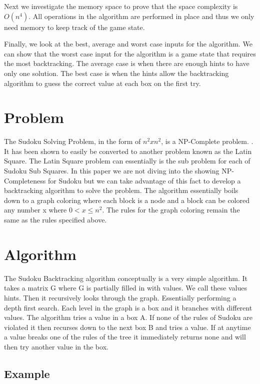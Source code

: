 \documentclass{sig-alternate}
\begin{document}
Next we investigate the memory space to prove that the space complexity is $O(n^4)$. All operations in the algorithm are performed in place and thus we only need memory to keep track of the game state. 

Finally, we look at the best, average and worst case inputs for the algorithm. We can show that the worst case input for the algorithm is a game state that requires the most backtracking. The average case is when there are enough hints to have only one solution. The best case is when the hints allow the backtracking algorithm to guess the correct value at each box on the first try. 

\section{Problem}
The Sudoku Solving Problem, in the form of $n^2 x n^2$, is a NP-Complete problem. \cite{YATO}. It has been shown to easily be converted to another problem known as the Latin Square. The Latin Square problem can essentially is the sub problem for each of Sudoku Sub Squares. In this paper we are not diving into the showing NP-Completeness for Sudoku but we can take advantage of this fact to develop a backtracking algorithm to solve the problem. The algorithm essentially boils down to a graph coloring where each block is a node and a block can be colored any number x where $0 < x \le n^2$. The rules for the graph coloring remain the same as the rules specified above. 
\cite{YATO}

\section{Algorithm}
The Sudoku Backtracking algorithm conceptually is a very simple algorithm. It takes a matrix G where G is partially filled in with values. We call these values hints. Then it recursively looks through the graph. Essentially performing a depth first search. Each level in the graph is a box and it branches with different values. The algorithm tries a value in a box A. If none of the rules of Sudoku are violated it then recurses down to the next box B and tries a value. If at anytime a value breaks one of the rules of the tree it immediately returns none and will then try another value in the box. 

\subsection{Example}
\end{document}
